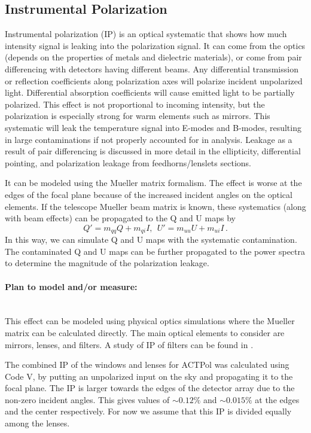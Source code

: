 \subsection{Instrumental Polarization} 
\label{instrumental_polarization}

Instrumental polarization (IP) is an optical systematic that shows how much intensity signal is leaking into the polarization signal. It can come from the optics (depends on the properties of metals and dielectric materials), or come from pair differencing with detectors having different beams. Any differential transmission or reflection coefficients along polarization axes will polarize incident unpolarized light. 
Differential absorption coefficients will cause emitted light to be partially polarized. This effect is not proportional to incoming intensity, but the polarization is especially strong for warm elements such as mirrors.
This systematic will leak the temperature signal into E-modes and B-modes, resulting in large contaminations if not properly accounted for in analysis. Leakage as a result of pair differencing is discussed in more detail in the ellipticity, differential pointing, and polarization leakage from feedhorns/lenslets sections.

It can be modeled using the Mueller matrix formalism. The effect is worse at the edges of the focal plane because of the increased incident angles on the optical elements. If the telescope Mueller beam matrix is known, these systematics (along with beam effects) can be propagated to the Q and U maps by
\begin{equation}
Q' = m_{qq} Q + m_{qi} I, \ \ U' = m_{uu} U + m_{ui} I \, .
\end{equation}
In this way, we can simulate Q and U maps with the systematic contamination. The contaminated Q and U maps can be further propagated to the power spectra to determine the magnitude of the polarization leakage.

\paragraph{Plan to model and/or measure:} \mbox{}\\

This effect can be modeled using physical optics simulations where the Mueller matrix can be calculated directly. 
The main optical elements to consider are mirrors, lenses, and filters.
A study of IP of filters can be found in \cite{pisano2005}.

The combined IP of the windows and lenses for ACTPol was calculated using Code V, 
by putting an unpolarized input on the sky and propagating it to the focal plane.
The IP is larger towards the edges of the detector array due to the non-zero incident angles.
This gives values of $\sim0.12\%$ and $\sim0.015\%$ at the edges and the center respectively.
For now we assume that this IP is divided equally among the lenses. 




